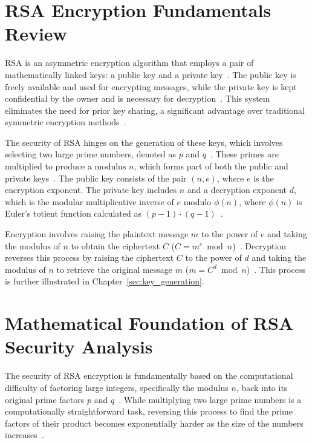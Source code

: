\documentclass[12pt,a4paper]{report}
\begin{document}
\section{RSA Encryption Fundamentals Review}
RSA is an asymmetric encryption algorithm that employs a pair of mathematically linked keys: a public key and a private key~\cite{SecureW2}. The public key is freely available and used for encrypting messages, while the private key is kept confidential by the owner and is necessary for decryption~\cite{SecureW2}. This system eliminates the need for prior key sharing, a significant advantage over traditional symmetric encryption methods~\cite{SplunkRSA}. 

The security of RSA hinges on the generation of these keys, which involves selecting two large prime numbers, denoted as \(p\) and \(q\)~\cite{SecureW2}. These primes are multiplied to produce a modulus \(n\), which forms part of both the public and private keys~\cite{SecureW2}. The public key consists of the pair \((n, e)\), where \(e\) is the encryption exponent. The private key includes \(n\) and a decryption exponent \(d\), which is the modular multiplicative inverse of \(e\) modulo \(\phi(n)\), where \(\phi(n)\) is Euler's totient function calculated as \((p - 1) \cdot (q - 1)\)~\cite{GeeksForGeeks}. 

Encryption involves raising the plaintext message \(m\) to the power of \(e\) and taking the modulus of \(n\) to obtain the ciphertext \(C\) (\(C = m^e \bmod n\))~\cite{GeeksForGeeks}. Decryption reverses this process by raising the ciphertext \(C\) to the power of \(d\) and taking the modulus of \(n\) to retrieve the original message \(m\) (\(m = C^d \bmod n\))~\cite{GeeksForGeeks}. This process is further illustrated in Chapter~\ref{sec:key_generation}.

\section{Mathematical Foundation of RSA Security Analysis}
The security of RSA encryption is fundamentally based on the computational difficulty of factoring large integers, specifically the modulus \(n\), back into its original prime factors \(p\) and \(q\)~\cite{SecureW2}. While multiplying two large prime numbers is a computationally straightforward task, reversing this process to find the prime factors of their product becomes exponentially harder as the size of the numbers increases~\cite{SecureW2}.
\end{document}
